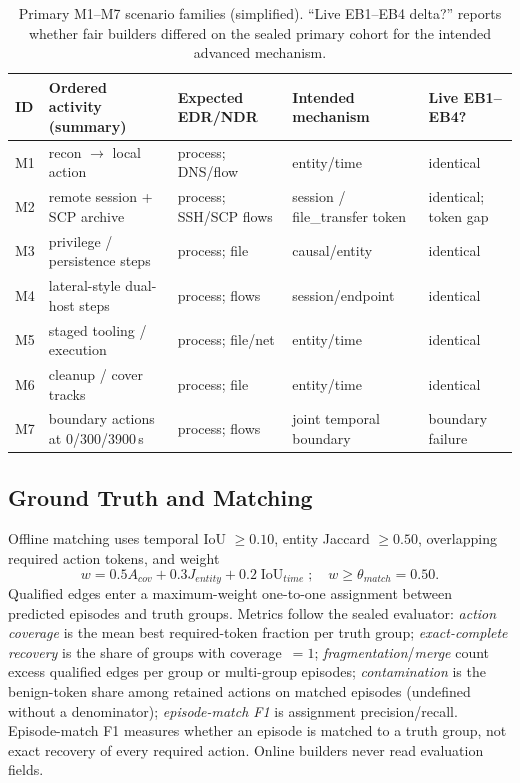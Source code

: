 \begin{table}[!t]
\caption{Primary M1--M7 scenario families (simplified). ``Live EB1--EB4 delta?'' reports whether
fair builders differed on the sealed primary cohort for the intended advanced mechanism.}
\label{tab:scenario-families}
\centering
\scriptsize
\begin{tabular}{llp{}p{}p{}}
\toprule
\textbf{ID} & \textbf{Ordered activity (summary)} & \textbf{Expected EDR/NDR} & \textbf{Intended mechanism} & \textbf{Live EB1--EB4?} \\
\midrule
M1 & recon $\rightarrow$ local action & process; DNS/flow & entity/time & identical \\
M2 & remote session + SCP archive & process; SSH/SCP flows & session / file\_transfer token & identical; token gap \\
M3 & privilege / persistence steps & process; file & causal/entity & identical \\
M4 & lateral-style dual-host steps & process; flows & session/endpoint & identical \\
M5 & staged tooling / execution & process; file/net & entity/time & identical \\
M6 & cleanup / cover tracks & process; file & entity/time & identical \\
M7 & boundary actions at 0/300/3900\,s & process; flows & joint temporal boundary & boundary failure \\
\bottomrule
\end{tabular}
\end{table}

\subsection{Ground Truth and Matching}
\label{sec:ground-truth}

Offline matching uses temporal IoU $\ge0.10$, entity Jaccard $\ge0.50$, overlapping required
action tokens, and weight
\begin{equation}
w=0.5A_{cov}+0.3J_{entity}+0.2\operatorname{IoU}_{time};
\quad w\ge\theta_{match}=0.50.
\label{eq:match-weight}
\end{equation}
Qualified edges enter a maximum-weight one-to-one assignment between predicted episodes and truth
groups. Metrics follow the sealed evaluator: \emph{action coverage} is the mean best required-token
fraction per truth group; \emph{exact-complete recovery} is the share of groups with coverage~$=1$;
\emph{fragmentation}/\emph{merge} count excess qualified edges per group or multi-group episodes;
\emph{contamination} is the benign-token share among retained actions on matched episodes (undefined
without a denominator); \emph{episode-match F1} is assignment precision/recall. Episode-match F1
measures whether an episode is matched to a truth group, not exact recovery of every required action.
Online builders never read evaluation fields.


